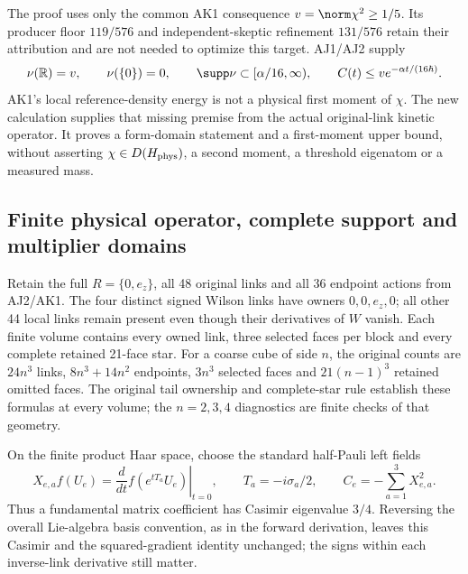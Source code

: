 The proof uses only the common AK1 consequence $v=\norm\chi^2\ge1/5$. Its producer floor $119/576$ and independent-skeptic refinement $131/576$ retain their attribution and are not needed to optimize this target. AJ1/AJ2 supply
\begin{equation}
 \nu(\mathbb R)=v,\qquad\nu(\{0\})=0,\qquad
 \supp\nu\subset[\alpha/16,\infty),\qquad
 C(t)\le v e^{-\alpha t/(16\hbar)}.
 \label{r28:eq:ak2-inherited}
\end{equation}
AK1's local reference-density energy is not a physical first moment of $\chi$. The new calculation supplies that missing premise from the actual original-link kinetic operator. It proves a form-domain statement and a first-moment upper bound, without asserting $\chi\in D(H_{\rm phys})$, a second moment, a threshold eigenatom or a measured mass.

\subsection{Finite physical operator, complete support and multiplier domains}
Retain the full $R=\{0,e_z\}$, all 48 original links and all 36 endpoint actions from AJ2/AK1. The four distinct signed Wilson links have owners $0,0,e_z,0$; all other 44 local links remain present even though their derivatives of $W$ vanish. Each finite volume contains every owned link, three selected faces per block and every complete retained 21-face star. For a coarse cube of side $n$, the original counts are $24n^3$ links, $8n^3+14n^2$ endpoints, $3n^3$ selected faces and $21(n-1)^3$ retained omitted faces. The original tail ownership and complete-star rule establish these formulas at every volume; the $n=2,3,4$ diagnostics are finite checks of that geometry.

On the finite product Haar space, choose the standard half-Pauli left fields
\begin{equation}
 X_{e,a}f(U_e)=\left.\frac d{dt}f(e^{tT_a}U_e)\right|_{t=0},
 \qquad T_a=-i\sigma_a/2,\qquad C_e=-\sum_{a=1}^3X_{e,a}^2.
 \label{r28:eq:ak2-casimir}
\end{equation}
Thus a fundamental matrix coefficient has Casimir eigenvalue $3/4$. Reversing the overall Lie-algebra basis convention, as in the forward derivation, leaves this Casimir and the squared-gradient identity unchanged; the signs within each inverse-link derivative still matter.

